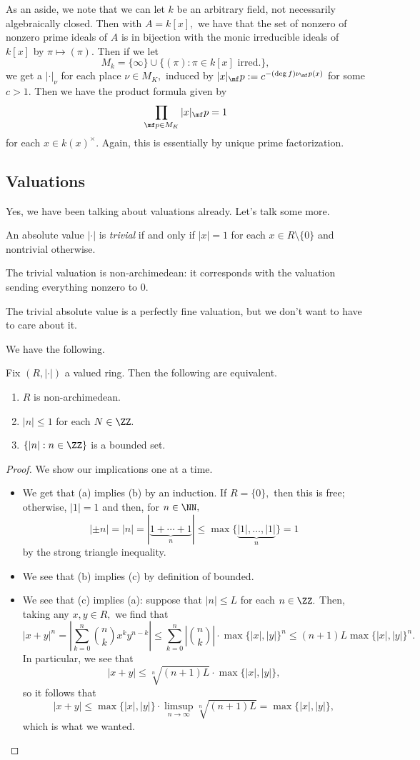 As an aside, we note that we can let $k$ be an arbitrary field, not necessarily algebraically closed. Then with $A=k[x],$ we have that the set of nonzero of nonzero prime ideals of $A$ is in bijection with the monic irreducible ideals of $k[x]$ by $\pi\mapsto(\pi).$ Then if we let
\[M_k=\{\infty\}\cup\{(\pi):\pi\in k[x]\text{ irred.}\},\]
we get a $|\cdot|_\nu$ for each place $\nu\in M_K,$ induced by $|x|_\mf p:=c^{-(\deg f)\nu_\mf p(x)}$ for some $c>1.$ Then we have the product formula given by
\[\prod_{\mf p\in M_K}|x|_\mf p=1\]
for each $x\in k(x)^\times.$ Again, this is essentially by unique prime factorization.

\subsection{Valuations}
Yes, we have been talking about valuations already. Let's talk some more.
\begin{definition}[Trivial]
	An absolute value $|\cdot|$ is \textit{trivial} if and only if $|x|=1$ for each $x\in R\setminus\{0\}$ and nontrivial otherwise.
\end{definition}
\begin{remark}
	The trivial valuation is non-archimedean: it corresponds with the valuation sending everything nonzero to $0.$
\end{remark}
The trivial absolute value is a perfectly fine valuation, but we don't want to have to care about it.

We have the following.
\begin{proposition}
	Fix $(R,|\cdot|)$ a valued ring. Then the following are equivalent.
	\begin{enumerate}[label=(\alph*)]
		\item $R$ is non-archimedean.
		\item $|n|\le1$ for each $N\in\ZZ.$
		\item $\{|n|:n\in\ZZ\}$ is a bounded set.
	\end{enumerate}
\end{proposition}
\begin{proof}
	We show our implications one at a time.
	\begin{itemize}
		\item We get that (a) implies (b) by an induction. If $R=\{0\},$ then this is free; otherwise, $|1|=1$ and then, for $n\in\NN,$
		\[|\pm n|=|n|=|\underbrace{1+\cdots+1}_n|\le\max\{\underbrace{|1|,\ldots,|1|}_n\}=1\]
		by the strong triangle inequality.
		\item We see that (b) implies (c) by definition of bounded.
		\item We see that (c) implies (a): suppose that $|n|\le L$ for each $n\in\ZZ.$ Then, taking any $x,y\in R,$ we find that
		\[|x+y|^n=\left|\sum_{k=0}^n\binom nkx^ky^{n-k}\right|\le\sum_{k=0}^n\left|\binom nk\right|\cdot\max\{|x|,|y|\}^n\le(n+1)L\max\{|x|,|y|\}^n.\]
		In particular, we see that
		\[|x+y|\le\sqrt[n]{(n+1)L}\cdot\max\{|x|,|y|\},\]
		so it follows that
		\[|x+y|\le\max\{|x|,|y|\}\cdot\limsup_{n\to\infty}\sqrt[n]{(n+1)L}=\max\{|x|,|y|\},\]
		which is what we wanted.
		\qedhere
	\end{itemize}
\end{proof}